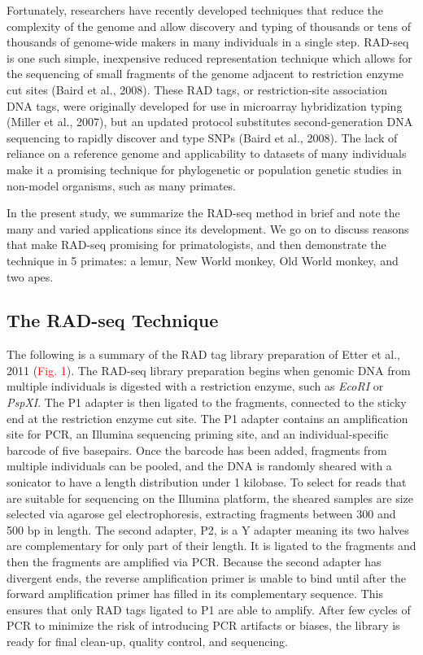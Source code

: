 \documentclass[12pt]{article}
\begin{document}
Fortunately, researchers have recently developed techniques that reduce the complexity of the genome and allow discovery and typing of thousands or tens of thousands of genome-wide makers in many individuals in a single step. RAD-seq is one such simple, inexpensive reduced representation technique which allows for the sequencing of small fragments of the genome adjacent to restriction enzyme cut sites (Baird et al., 2008). These RAD tags, or restriction-site association DNA tags, were originally developed for use in microarray hybridization typing (Miller et al., 2007), but an updated protocol substitutes second-generation DNA sequencing to rapidly discover and type SNPs (Baird et al., 2008). The lack of reliance on a reference genome and applicability to datasets of many individuals make it a promising technique for phylogenetic or population genetic studies in non-model organisms, such as many primates.

In the present study, we summarize the RAD-seq method in brief and note the many and varied applications since its development. We go on to discuss reasons that make RAD-seq promising for primatologists, and then demonstrate the technique in 5 primates: a lemur, New World monkey, Old World monkey, and two apes.  

\subsection{The RAD-seq Technique}

The following is a summary of the RAD tag library preparation of Etter et al., 2011 (\textcolor{red}{Fig. 1}). The RAD-seq library preparation begins when genomic DNA from multiple individuals is digested with a restriction enzyme, such as \emph{EcoRI} or \emph{PspXI}. The P1 adapter is then ligated to the fragments, connected to the sticky end at the restriction enzyme cut site. The P1 adapter contains an amplification site for PCR, an Illumina sequencing priming site, and an individual-specific barcode of five basepairs. Once the barcode has been added, fragments from multiple individuals can be pooled, and the DNA is randomly sheared with a sonicator to have a length distribution under 1 kilobase. To select for reads that are suitable for sequencing on the Illumina platform, the sheared samples are size selected via agarose gel electrophoresis, extracting fragments between 300 and 500 bp in length. The second adapter, P2, is a Y adapter meaning its two halves are complementary for only part of their length. It is ligated to the fragments and then the fragments are amplified via PCR. Because the second adapter has divergent ends, the reverse amplification primer is unable to bind until after the forward amplification primer has filled in its complementary sequence. This ensures that only RAD tags ligated to P1 are able to amplify. After few cycles of PCR to minimize the risk of introducing PCR artifacts or biases, the library is ready for final clean-up, quality control, and sequencing.
\end{document}
